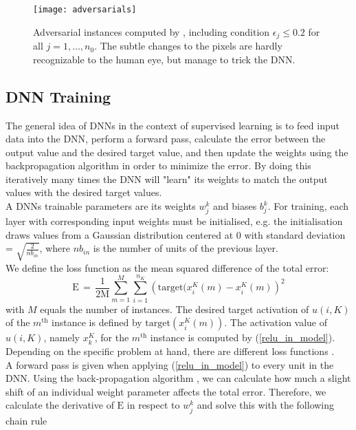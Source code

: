 \documentclass{article}
\begin{document}
\begin{figure}[!htb]
\vskip 0.2in
\begin{center}
\centerline{\texttt{[image: adversarials]}}
\caption{Adversarial instances computed by \cite{fischetti17}, including condition $\epsilon_j \leq 0.2$ for all $j=1,\ldots,n_0$. The subtle changes to the pixels are hardly recognizable to the human eye, but manage to trick the DNN.}
\label{adversarials}
\end{center}
\vskip -0.2in
\end{figure}

\subsection{DNN Training}
\label{DNN_training}

The general idea of DNNs in the context of supervised learning is to feed input data into the DNN, perform a forward pass, calculate the error between the output value and the desired target value, and then update the weights using the backpropagation algorithm in order to minimize the error. By doing this iteratively many times the DNN will "learn" its weights to match the output values with the desired target values.\\
A DNNs trainable parameters are its weights $w_j^k$ and biases $b_j^k$. For training, each layer with corresponding input weights must be initialised, e.g. the \cite{he15} initialisation draws values from a Gaussian distribution centered at 0 with standard deviation = $\sqrt{\frac{2}{nb_{in}}}$, where $nb_{in}$ is the number of units of the previous layer.\\
We define the loss function as the mean squared difference of the total error: 
$$ \text{E} \, = \, \frac{1}{2\text{M}} \sum_{m=1}^M \sum^{n_K}_{i=1}  \left(\text{target}(x_i^K(m) - x_i^K(m) \right)^2$$
with $M$ equals the number of instances. The desired target activation of $u(i,K)$ of the $m^{\text{th}}$ instance is defined by $\text{target}(x_i^K(m))$. The activation value of $u(i,K)$, namely $x_k^K$, for the $m^{\text{th}}$ instance is computed by (\ref{relu_in_model}).\\
Depending on the specific problem at hand, there are different loss functions \cite{lossfunctions}.\\
A forward pass is given when applying (\ref{relu_in_model}) to every unit in the DNN.
Using the back-propagation algorithm \cite{yann89}, we can calculate how much a slight shift of an individual weight parameter affects the total error. Therefore, we calculate the derivative of $\text{E}$ in respect to $w_j^k$ and solve this with the following chain rule \cite{avrutskiy17}
\end{document}
